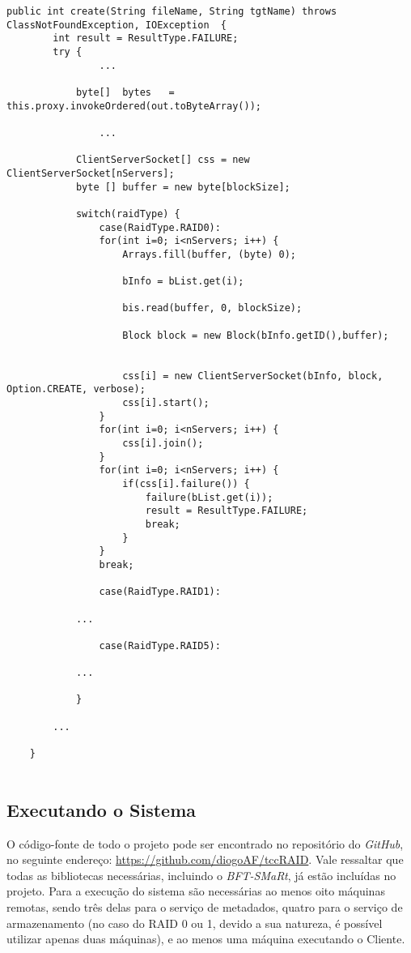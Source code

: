 \begin{lstlisting}[basicstyle=\ttfamily\footnotesize, frame=single, caption=Exemplo de método da classe ClientDFS para operação sobre arquivos, label=code:clent_dfs2]	
	public int create(String fileName, String tgtName) throws ClassNotFoundException, IOException  {
		int result = ResultType.FAILURE;
		try {
				...
		
			byte[]  bytes   = this.proxy.invokeOrdered(out.toByteArray());
			
				...
					
			ClientServerSocket[] css = new ClientServerSocket[nServers];
			byte [] buffer = new byte[blockSize];
			
			switch(raidType) {
				case(RaidType.RAID0):
				for(int i=0; i<nServers; i++) {
					Arrays.fill(buffer, (byte) 0);
					
					bInfo = bList.get(i);
					
					bis.read(buffer, 0, blockSize);
					
					Block block = new Block(bInfo.getID(),buffer);
					
					
					css[i] = new ClientServerSocket(bInfo, block, Option.CREATE, verbose);
					css[i].start();   
				}
				for(int i=0; i<nServers; i++) {
					css[i].join();
				}
				for(int i=0; i<nServers; i++) {
					if(css[i].failure()) {
						failure(bList.get(i));
						result = ResultType.FAILURE;
						break;
					}
				}
				break;
				
				case(RaidType.RAID1):
						
			...
		
				case(RaidType.RAID5):
				
			...
			
			}
		
		...
		
	}
			
\end{lstlisting}

\subsection{Executando o Sistema}
O código-fonte de todo o projeto pode ser encontrado no repositório do \textit{GitHub}, no seguinte endereço:  \href{https://github.com/diogoAF/tccRAID}{https://github.com/diogoAF/tccRAID}. Vale ressaltar que todas as bibliotecas necessárias, incluindo o  \textit{BFT-SMaRt}, já estão incluídas no projeto. Para a execução do sistema são necessárias ao menos oito máquinas remotas, sendo três delas para o serviço de metadados, quatro para o serviço de armazenamento (no caso do RAID 0 ou 1, devido a sua natureza, é possível utilizar apenas duas máquinas), e ao menos uma máquina executando o Cliente.
\\

